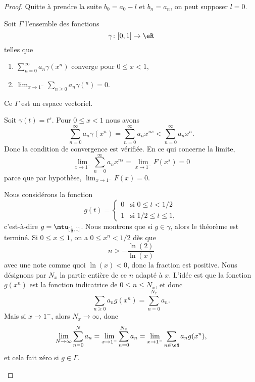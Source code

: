 \begin{proof}
	Quitte à prendre la suite \( b_0=a_0-l\) et \( b_n=a_n\), on peut supposer \( l=0\).

	Soit \( \Gamma\) l'ensemble des fonctions
	\begin{equation}
		\gamma\colon \mathopen[ 0 , 1 \mathclose]\to \eR
	\end{equation}
	telles que
	\begin{enumerate}
		\item
		      \( \sum_{n=0}^{\infty}a_n\gamma(x^n)\) converge pour \( 0\leq x<1\),
		\item
		      \( \lim_{x\to 1^-} \sum_{n\geq 0}a_n\gamma(^n)=0\).
	\end{enumerate}
	Ce \( \Gamma\) est un espace vectoriel.
	\begin{subproof}
		Soit \( \gamma(t)=t^s\). Pour \( 0\leq x<1\) nous avons
		\begin{equation}
			\sum_{n=0}^{\infty}a_n\gamma(x^n)=\sum_{n=0}^{\infty}a_nx^{ns}<\sum_{n=0}^{\infty}a_nx^n.
		\end{equation}
		Donc la condition de convergence est vérifiée. En ce qui concerne la limite,
		\begin{equation}
			\lim_{x\to 1^-} \sum_{n=0}^{\infty}a_nx^{ns}=\lim_{x\to 1^-} F(x^s)=0
		\end{equation}
		parce que par hypothèse, \( \lim_{x\to 1^-} F(x)=0\).

		Nous considérons la fonction
		\begin{equation}
			g(t)=\begin{cases}
				0 & \text{si } 0\leq t<1/2      \\
				1 & \text{si } 1/2\leq t\leq 1,
			\end{cases}
		\end{equation}
		c'est-à-dire \( g=\mtu_{\mathopen[ \frac{ 1 }{2} , 1 \mathclose]}\). Nous montrons que si \( g\in \gamma\), alors le théorème est terminé. Si \( 0\leq x\leq 1\), on a \( 0\leq x^n<1/2\) dès que
		\begin{equation}
			n>-\frac{ \ln(2) }{ \ln(x) }
		\end{equation}
		avec une note comme quoi \( \ln(x)<0\), donc la fraction est positive. Nous désignons par \( N_x\) la partie entière de ce \( n\) adapté à \( x\). L'idée est que la fonction  \( g(x^n)\) est la fonction indicatrice de \(0 \leq n\leq N_x\), et donc
		\begin{equation}
			\sum_{n\geq 0}a_ng(x^n)=\sum_{n=0}^{N_x}a_n.
		\end{equation}
		Mais si \( x\to 1^-\), alors \( N_x\to \infty\), donc
		\begin{equation}
			\lim_{N\to \infty} \sum_{n=0}^Na_n=\lim_{x\to 1^-} \sum_{n=0}^{N_x}a_n=\lim_{x\to 1^-} \sum_{n\in \eN}a_ng(x^n),
		\end{equation}
		et cela fait zéro si \( g\in \Gamma\).


\end{subproof}
\end{proof}
